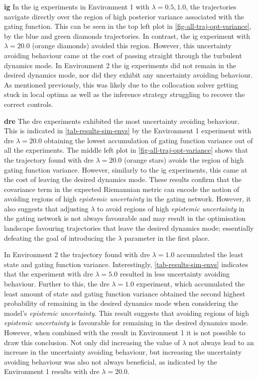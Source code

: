 \documentclass{mimosis-class/mimosis}
\numberwithin{equation}{chapter}
\begin{document}
{\textbf{\acrfull{ig}}
In the \acrshort{ig} experiments in Environment 1 with \(\lambda=0.5, 1.0\), the trajectories navigate
directly over the region of high posterior variance associated with the gating function.
This can be seen in the top left plot in \cref{fig-all-traj-opt-variance}, by the blue and green diamonds trajectories.
In contrast, the \acrshort{ig} experiment with \(\lambda=20.0\) (orange diamonds) avoided this region.
However, this uncertainty avoiding behaviour came at the cost
of passing straight through the turbulent dynamics mode.
In Environment 2 the \acrshort{ig} experiments did not remain in the desired dynamics mode, nor did they exhibit
any uncertainty avoiding behaviour.
As mentioned previously, this was likely due to the collocation solver getting stuck in local optima
as well as the inference strategy struggling to recover the correct controls.
\newline

\textbf{\acrfull{dre}}
The \acrshort{dre} experiments exhibited the most uncertainty avoiding behaviour.
This is indicated in \cref{tab-results-sim-envs} by the Environment 1 experiment with \acrshort{dre} \(\lambda=20.0\)
obtaining the lowest accumulation of gating function variance out of all the experiments.
The middle left plot in \cref{fig-all-traj-opt-variance}
shows that the trajectory found with \acrshort{dre} \(\lambda=20.0\) (orange stars)
avoids the region of high gating function variance.
However, similarly to the \acrshort{ig} experiments, this came at the cost of leaving the desired dynamics mode.
These results confirm that the covariance term in the expected Riemannian metric can encode the notion of avoiding
regions of high \emph{epistemic uncertainty} in the gating network.
However, it also suggests that adjusting \(\lambda\) to avoid regions of high \emph{epistemic uncertainty}
in the gating network is not always favourable and may result in the optimisation landscape favouring trajectories
that leave the desired dynamics mode;
essentially defeating the goal of introducing the \(\lambda\) parameter in the first place.

In Environment 2 the trajectory found with \acrshort{dre} \(\lambda=1.0\) accumulated the
least state and gating function variance.
Interestingly, \cref{tab-results-sim-envs} indicates that the experiment with \acrshort{dre} \(\lambda=5.0\)
resulted in less uncertainty avoiding behaviour.
Further to this, the \acrshort{dre} \(\lambda=1.0\) experiment, which accumulated the least amount of state and gating
function variance obtained the second highest probability of remaining in the desired dynamics mode
when considering the model's \emph{epistemic uncertainty}.
This result suggests that avoiding regions of high \emph{epistemic uncertainty} is favourable for
remaining in the desired dynamics mode.
However, when combined with the result in Environment 1 it is not possible
to draw this conclusion.
Not only did increasing the value of \(\lambda\) not always lead to an increase in the uncertainty avoiding
behaviour, but increasing the uncertainty avoiding behaviour was also not always beneficial,
as indicated by the Environment 1 results with \acrshort{dre} \(\lambda=20.0\).

}
\end{document}
